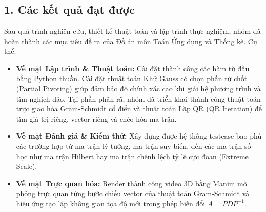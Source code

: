 \newpage
\chapter*{}
{}

\section*{1. Các kết quả đạt được}
{}
Sau quá trình nghiên cứu, thiết kế thuật toán và lập trình thực nghiệm, nhóm đã hoàn thành các mục tiêu đề ra của Đồ án môn Toán Ứng dụng và Thống kê. Cụ thể:
\begin{itemize}
    \item \textbf{Về mặt Lập trình \& Thuật toán:} Cài đặt thành công các hàm từ đầu bằng Python thuần. Cài đặt thuật toán Khử Gauss có chọn phần tử chốt (Partial Pivoting) giúp đảm bảo độ chính xác cao khi giải hệ phương trình và tìm nghịch đảo. Tại phần phân rã, nhóm đã triển khai thành công thuật toán trực giao hóa Gram-Schmidt cổ điển và thuật toán Lặp QR (QR Iteration) để tìm giá trị riêng, vector riêng và chéo hóa ma trận.
    \item \textbf{Về mặt Đánh giá \& Kiểm thử:} Xây dựng được hệ thống testcase bao phủ các trường hợp từ ma trận lý tưởng, ma trận suy biến, đến các ma trận số học như ma trận Hilbert hay ma trận chênh lệch tỷ lệ cực đoan (Extreme Scale).
    \item \textbf{Về mặt Trực quan hóa:} Render thành công video 3D bằng Manim mô phỏng trực quan từng bước chiếu vector của thuật toán Gram-Schmidt và hiệu ứng tạo lập không gian tọa độ mới trong phép biến đổi $A = PDP^{-1}$.
\end{itemize}

